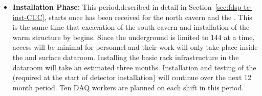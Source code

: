 \begin{itemize}
   \item {\bf {} Installation Phase:}
    This period,described in detail in Section~\ref{sec:fdsp-tc-inst-CUC}, starts once  has been received for the north cavern and the . This is the same time that excavation of the south cavern and installation of the warm structure by  begins. Since the  underground is limited to 144 at a time, access will be minimal for  personnel and their work will only take place inside the  and surface dataroom. Installing the basic rack infrastructure in the dataroom will take an estimated three months. Installation and testing of the  (required at the start of detector installation) will continue over the next 12 month period. Ten DAQ workers are planned on each shift in this period.
     
    
    

\end{itemize}
